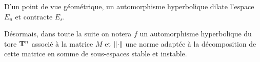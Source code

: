   \begin{remark}
    D'un point de vue géométrique, un automorphisme hyperbolique dilate l'espace $E_u$ et contracte $E_s$.
  \end{remark}

  Désormais, dans toute la suite on notera $f$ un automorphisme hyperbolique du tore $\mathbf T^n$ associé à la matrice $M$ et $\left\lVert \cdot\right\rVert$
  une norme adaptée à la décomposition de cette matrice en somme de sous-espaces stable et instable.
